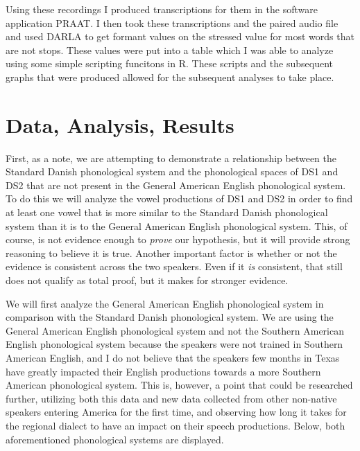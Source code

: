     \bigskip
    
    Using these recordings I produced transcriptions for them in the software application PRAAT. I then took these transcriptions and the paired audio file and used DARLA to get formant values on the stressed value for most words that are not stops. These values were put into a table which I was able to analyze using some simple scripting funcitons in R. These scripts and the subsequent graphs that were produced allowed for the subsequent analyses to take place.
    
    
\section{Data, Analysis, Results}
    \bigskip
  
  \quad First, as a note, we are attempting to demonstrate a relationship between the Standard Danish phonological system and the phonological spaces of DS1 and DS2 that are not present in the General American English phonological system. To do this we will analyze the vowel productions of DS1 and DS2 in order to find at least one vowel that is more similar to the Standard Danish phonological system than it is to the General American English phonological system. This, of course, is not evidence enough to \emph{prove} our hypothesis, but it will provide strong reasoning to believe it is true. Another important factor is whether or not the evidence is consistent across the two speakers. Even if it \emph{is} consistent, that still does not qualify as total proof, but it makes for stronger evidence.
  
 \bigskip
 
    We will first analyze the General American English phonological system in comparison with the Standard Danish phonological system. We are using the General American English phonological system and not the Southern American English phonological system because the speakers were not trained in Southern American English, and I do not believe that the speakers few months in Texas have greatly impacted their English productions towards a more Southern American phonological system. This is, however, a point that could be researched further, utilizing both this data and new data collected from other non-native speakers entering America for the first time, and observing how long it takes for the regional dialect to have an impact on their speech productions. Below, both aforementioned phonological systems are displayed.
    
    \bigskip
    
